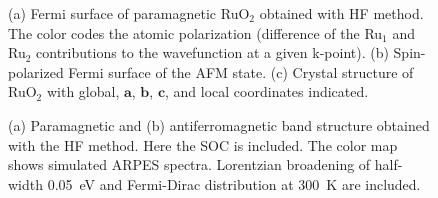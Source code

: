 \documentclass[reprint,twocolumn,superscriptaddress,secnumarabic,amssymb, nobibnotes, aps, prb]{revtex4-1}
\begin{document}
\begin{figure}[t]
\caption{(a) Fermi surface of paramagnetic RuO$_2$ obtained with HF method. The color codes the 
atomic polarization (difference of the Ru$_1$ and Ru$_2$ contributions to the wavefunction at a given k-point).
(b) Spin-polarized Fermi surface of the AFM state.
(c) Crystal structure of RuO$_2$ with global, $\mathbf{a}$, $\mathbf{b}$, $\mathbf{c}$,
and local coordinates indicated.
}
\label{fig:fermi}
\end{figure}

\begin{figure}[t]
\caption{(a) Paramagnetic and (b) antiferromagnetic band structure obtained with the HF method. Here the SOC is included. The color map shows simulated ARPES spectra. Lorentzian broadening of half-width 0.05~eV and Fermi-Dirac distribution at 300~K are included.}
\label{fig:arpes}
\end{figure}
\end{document}
